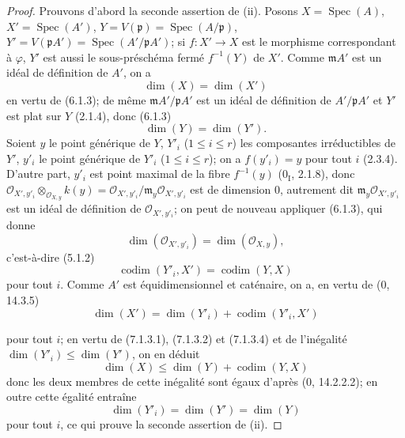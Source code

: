 \begin{proof}
Prouvons d'abord la seconde assertion de (ii). Posons
$X=\operatorname{Spec}(A)$, $X'=\operatorname{Spec}(A')$,
$Y=V(\mathfrak p)=\operatorname{Spec}(A/\mathfrak p)$,
$Y'=V(\mathfrak pA')=\operatorname{Spec}(A'/\mathfrak pA')$; si
$f:X'\to X$ est le morphisme correspondant à $\varphi$, $Y'$ est aussi le
sous-préschéma fermé $f^{-1}(Y)$ de $X'$. Comme $\mathfrak mA'$ est un idéal
de définition de $A'$, on a
\begin{equation}
\dim(X)=\dim(X')
\tag{7.1.3.1}
\label{IV.2.eq.7.1.3.1-fr}
\end{equation}
en vertu de (6.1.3); de même $\mathfrak mA'/\mathfrak pA'$ est un idéal de
définition de $A'/\mathfrak pA'$ et $Y'$ est plat sur $Y$ (2.1.4), donc
(6.1.3)
\begin{equation}
\dim(Y)=\dim(Y').
\tag{7.1.3.2}
\label{IV.2.eq.7.1.3.2-fr}
\end{equation}
Soient $y$ le point générique de $Y$, $Y'_i$ ($1\leqslant i\leqslant r$) les
composantes irréductibles de $Y'$, $y'_i$ le point générique de $Y'_i$
($1\leqslant i\leqslant r$); on a $f(y'_i)=y$ pour tout $i$ (2.3.4).
D'autre part, $y'_i$ est point maximal de la fibre $f^{-1}(y)$ (0$_{\mathrm
I}$, 2.1.8), donc
$\mathscr O_{X',y'_i}\otimes_{\mathscr O_{X,y}}k(y)=
\mathscr O_{X',y'_i}/\mathfrak m_y\mathscr O_{X',y'_i}$ est de dimension
0, autrement dit $\mathfrak m_y\mathscr O_{X',y'_i}$ est un idéal de
définition de $\mathscr O_{X',y'_i}$; on peut de nouveau appliquer (6.1.3),
qui donne
\begin{equation}
\dim(\mathscr O_{X',y'_i})=\dim(\mathscr O_{X,y}),
\tag{7.1.3.3}
\label{IV.2.eq.7.1.3.3-fr}
\end{equation}
c'est-à-dire (5.1.2)
\begin{equation}
\operatorname{codim}(Y'_i,X')=\operatorname{codim}(Y,X)
\tag{7.1.3.4}
\label{IV.2.eq.7.1.3.4-fr}
\end{equation}
pour tout $i$. Comme $A'$ est équidimensionnel et caténaire, on a, en vertu
de (0, 14.3.5)
\begin{equation}
\dim(X')=\dim(Y'_i)+\operatorname{codim}(Y'_i,X')
\tag{7.1.3.5}
\label{IV.2.eq.7.1.3.5-fr}
\end{equation}

pour tout $i$; en vertu de (7.1.3.1), (7.1.3.2) et (7.1.3.4) et de
l'inégalité $\dim(Y'_i)\leqslant\dim(Y')$, on en déduit
\begin{equation}
\dim(X)\leqslant\dim(Y)+\operatorname{codim}(Y,X)
\tag{7.1.3.6}
\label{IV.2.eq.7.1.3.6-fr}
\end{equation}
donc les deux membres de cette inégalité sont égaux d'après (0, 14.2.2.2);
en outre cette égalité entraîne
\begin{equation}
\dim(Y'_i)=\dim(Y')=\dim(Y)
\tag{7.1.3.7}
\label{IV.2.eq.7.1.3.7-fr}
\end{equation}
pour tout $i$, ce qui prouve la seconde assertion de (ii).


\end{proof}
